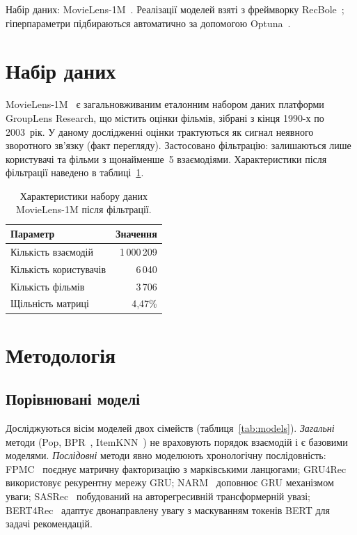 \documentclass[12pt,a4paper]{article}
\begin{document}
Набір даних: MovieLens-1M~\cite{harper2015movielens}.
Реалізації моделей взяті з фреймворку RecBole~\cite{zhao2021recbole};
гіперпараметри підбираються автоматично за допомогою Optuna~\cite{akiba2019optuna}.

\section{Набір даних}

MovieLens-1M~\cite{harper2015movielens} є загальновживаним еталонним набором
даних платформи GroupLens Research, що містить оцінки фільмів, зібрані з
кінця 1990-х по 2003~рік.
У даному дослідженні оцінки трактуються як сигнал неявного зворотного
зв'язку (факт перегляду).
Застосовано фільтрацію: залишаються лише користувачі та фільми з
щонайменше~5 взаємодіями.
Характеристики після фільтрації наведено в таблиці~\ref{tab:dataset}.

\begin{table}[h!]
\centering
\caption{Характеристики набору даних MovieLens-1M після фільтрації.}
\label{tab:dataset}
\begin{tabular}{lr}
\toprule
Параметр & Значення \\
\midrule
Кількість взаємодій   & 1\,000\,209 \\
Кількість користувачів & 6\,040 \\
Кількість фільмів      & 3\,706 \\
Щільність матриці      & 4{,}47\% \\
\bottomrule
\end{tabular}
\end{table}

\section{Методологія}

\subsection{Порівнювані моделі}

Досліджуються вісім моделей двох сімейств (таблиця~\ref{tab:models}).
\textit{Загальні} методи (Pop, BPR~\cite{rendle2009bpr},
ItemKNN~\cite{sarwar2001itemknn}) не враховують порядок взаємодій і
є базовими моделями.
\textit{Послідовні} методи явно моделюють хронологічну послідовність:
FPMC~\cite{rendle2010fpmc} поєднує матричну факторизацію з марківськими
ланцюгами;
GRU4Rec~\cite{hidasi2016gru4rec} використовує рекурентну мережу GRU;
NARM~\cite{li2017narm} доповнює GRU механізмом уваги;
SASRec~\cite{kang2018sasrec} побудований на авторегресивній трансформерній
увазі;
BERT4Rec~\cite{sun2019bert4rec} адаптує двонаправлену увагу з маскуванням токенів
BERT для задачі рекомендацій.
\end{document}
